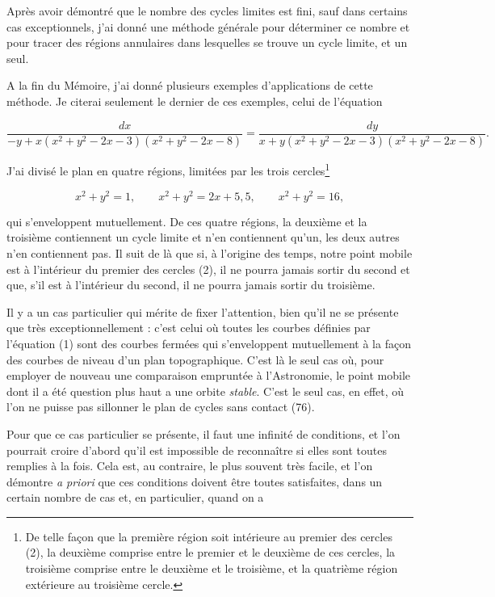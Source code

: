 \documentclass[11pt]{article}
\begin{document}
Après avoir démontré que le nombre des cycles limites est fini, sauf dans certains cas exceptionnels, j’ai donné une méthode générale pour déterminer ce nombre et pour tracer des régions annulaires dans lesquelles se trouve un cycle limite, et un seul.

A la fin du Mémoire, j’ai donné plusieurs exemples d’applications de cette méthode. Je citerai seulement le dernier de ces exemples, celui de l’équation

\[
\frac{dx}{-y+x(x^2+y^2-2x-3)(x^2+y^2-2x-8)}=
\frac{dy}{x+y(x^2+y^2-2x-3)(x^2+y^2-2x-8)}.
\]

J’ai divisé le plan en quatre régions, limitées par les trois cercles\footnote[1]{De telle façon que la première région soit intérieure au premier des cercles (2), la deuxième comprise entre le premier et le deuxième de ces cercles, la troisième comprise entre le deuxième et le troisième, et la quatrième région extérieure au troisième cercle.}

\begin{equation*}
 x^2+y^2=1,\qquad x^2+y^2=2x+5,5,\qquad x^2+y^2=16,
\tag{2}
\end{equation*}

qui s’enveloppent mutuellement. De ces quatre régions, la deuxième et la troisième contiennent un cycle limite et n’en contiennent qu’un, les deux autres n’en contiennent pas. Il suit de là que si, à l’origine des temps, notre point mobile est à l’intérieur du premier des cercles (2), il ne pourra jamais sortir du second et que, s’il est à l’intérieur du second, il ne pourra jamais sortir du troisième.

Il y a un cas particulier qui mérite de fixer l’attention, bien qu’il ne se présente que très exceptionnellement : c’est celui où toutes les courbes définies par l’équation (1) sont des courbes fermées qui s’enveloppent mutuellement à la façon des courbes de niveau d’un plan topographique. C’est là le seul cas où, pour employer de nouveau une comparaison empruntée à l’Astronomie, le point mobile dont il a été question plus haut a une orbite \emph{stable}. C’est le seul cas, en effet, où l’on ne puisse pas sillonner le plan de cycles sans contact (76).

Pour que ce cas particulier se présente, il faut une infinité de conditions, et l’on pourrait croire d’abord qu’il est impossible de reconnaître si elles sont toutes remplies à la fois. Cela est, au contraire, le plus souvent très facile, et l’on démontre \emph{a priori} que ces conditions doivent être toutes satisfaites, dans un certain nombre de cas et, en particulier, quand on a
\end{document}
